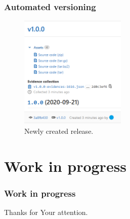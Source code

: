 \documentclass[10pt]{beamer}
\begin{document}
\begin{frame}[fragile]
\frametitle{Automated versioning}
\begin{figure}
    \centering
    \includegraphics[width=0.45\textwidth]{resources/new_release.PNG}
    \caption{Newly created release.}
\end{figure}
\end{frame}


\section{Work in progress}


\begin{frame}[fragile]
\frametitle{Work in progress}
\end{frame}

\begin{frame}[c]
\hfill
\begin{center}
\large{
	Thanks for Your attention.
}
\hfill
\end{center}
\end{frame}
\end{document}
